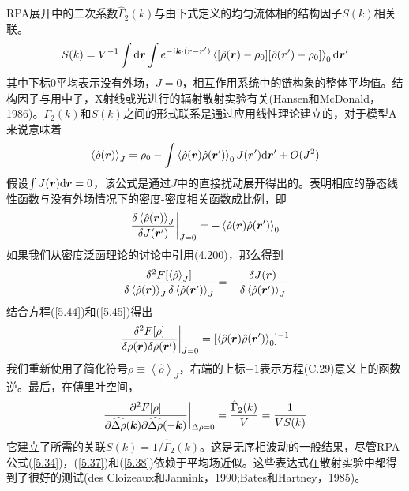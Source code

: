 RPA展开中的二次系数$\hat{\Gamma}_2(k)$与由下式定义的均匀流体相的结构因子$S(k)$相关联。
\begin{equation}
S(k)=V^{-1}\int\mathrm{d}\bm{r}\int e^{-i\bm{k}\cdot(\bm{r}-\bm{r}')}\left\langle[\hat{\rho}(\bm{r})-\rho_0][\hat{\rho}(\bm{r}')-\rho_0]\right\rangle_0\mathrm{d}\bm{r}'
\end{equation}
其中下标$0$平均表示没有外场，$J=0$，相互作用系统中的链构象的整体平均值。结构因子与用中子，X射线或光进行的辐射散射实验有关(Hansen和McDonald，1986)。$\Gamma_2(k)$和$S(k)$之间的形式联系是通过应用线性理论建立的，对于模型A来说意味着
\begin{equation}
\left\langle\hat{\rho}(\bm{r})\right\rangle_J=\rho_0-\int\left\langle\hat{\rho}(\bm{r})\hat{\rho}(\bm{r}')\right\rangle_0J(\bm{r}')\mathrm{d}\bm{r}'+O(J^2)
\end{equation}
假设$\int J(\bm{r})\mathrm{d}\bm{r}=0$，该公式是通过$J$中的直接扰动展开得出的。表明相应的静态线性函数与没有外场情况下的密度-密度相关函数成比例，即
\begin{equation}\label{5.44}
\frac{\delta\left\langle\hat{\rho}(\bm{r})\right\rangle_J}{\delta J(\bm{r}')}\bigg|_{J=0}=-\left\langle\hat{\rho}(\bm{r})\hat{\rho}(\bm{r}')\right\rangle_0
\end{equation}
如果我们从密度泛函理论的讨论中引用(4.200)，那么得到
\begin{equation}\label{5.45}
\frac{\delta^2F[\left\langle\hat{\rho}\right\rangle_J]}{\delta\left\langle\hat{\rho}(\bm{r})\right\rangle_J\delta\left\langle\hat{\rho}(\bm{r}')\right\rangle_J}=-\frac{\delta J(\bm{r})}{\delta\left\langle\hat{\rho}(\bm{r}')\right\rangle_J}
\end{equation}
结合方程(\ref{5.44})和(\ref{5.45})得出
\begin{equation}
\frac{\delta^2F[\rho]}{\delta\rho(\bm{r})\delta\rho(\bm{r}')}\bigg|_{J=0}=[\left\langle\hat{\rho}(\bm{r})\hat{\rho}(\bm{r}')\right\rangle_0]^{-1}
\end{equation}
我们重新使用了简化符号$\rho\equiv\left\langle\hat{\rho}\right\rangle_J$，右端的上标$-1$表示方程(C.29)意义上的函数逆。最后，在傅里叶空间，
\begin{equation}
\frac{\partial^2F[\rho]}{\partial\widehat{\Delta\rho}(\bm{k})\partial\widehat{\Delta\rho}(-\bm{k})}\bigg|_{\Delta\rho=0}=\frac{\hat{\Gamma}_2(k)}{V}=\frac{1}{VS(k)}
\end{equation}
它建立了所需的关联$S(k)=1/\hat{\Gamma}_2(k)$。这是无序相波动的一般结果，尽管RPA公式(\ref{5.34})，(\ref{5.37})和(\ref{5.38})依赖于平均场近似。这些表达式在散射实验中都得到了很好的测试(des Cloizeaux和Jannink，1990;Bates和Hartney，1985)。

